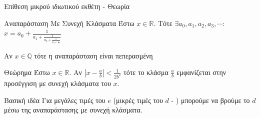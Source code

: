 \documentclass[handout]{beamer}
\begin{document}
\begin{frame}{Επίθεση μικρού ιδιωτικού εκθέτη - Θεωρία}
\begin{block}{Αναπαράσταση Με Συνεχή Κλάσματα}
Έστω $x \in \mathbb{R}$. Tότε $\exists a_0,a_1,a_2,a_3, \cdots$:
$x = a_0 + \frac{1}{a_1+\frac{1}{a_2+\frac{1}{a_3+\frac{1}{\cdots}}}}$

Αν $x \in \mathbb{Q}$ τότε η αναπαράσταση είναι πεπερασμένη
\end{block}
\pause
\begin{block}{Θεώρημα}
Έστω $x \in \mathbb{R}$. Αν $|x-\frac{a}{b}|<\frac{1}{2b^2}$ τότε το κλάσμα $\frac{a}{b}$ εμφανίζεται στην προσέγγιση με συνεχή κλάσματα του $x$.
\end{block}
\pause
\begin{block}{Βασική ιδέα}
Για μεγάλες τιμές του $e$ (μικρές τιμές του $d$ - ) μπορούμε να βρούμε το $d$ μέσω της αναπαράστασης με συνεχή κλάσματα.
\end{block}
\end{frame}
\end{document}
